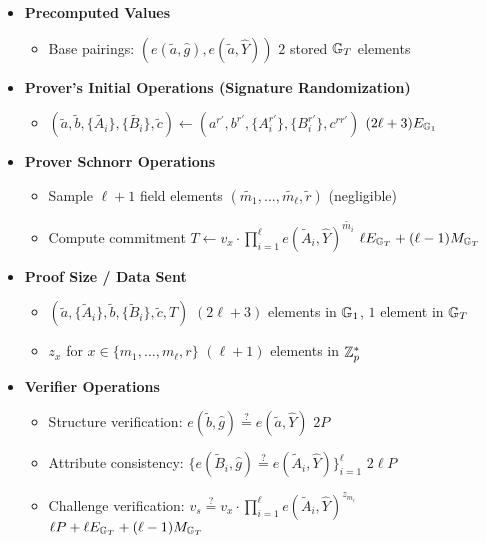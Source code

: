 \newpage
\begin{itemize}
    \item \textbf{Precomputed Values}
    \begin{itemize}
        \item Base pairings: $(e(\tilde{a}, \hat{g}), e(\tilde{a}, \widehat{Y}))$ \qquad $2$ stored $\mathbb{G}_T$ elements
    \end{itemize}

    \item \textbf{Prover's Initial Operations (Signature Randomization)}
    \begin{itemize}
        \item $(\tilde{a}, \tilde{b}, \{\tilde{A_i}\}, \{\tilde{B_i}\}, \tilde{c}) \gets (a^{r'}, b^{r'}, \{A_i^{r'}\}, \{B_i^{r'}\}, c^{rr'})$ \qquad $(2\ell + 3)E_{\mathbb{G}_1}$
    \end{itemize}
    
    \item \textbf{Prover Schnorr Operations}
    \begin{itemize}
        \item Sample $\ell+1$ field elements $(\tilde{m_1},\ldots,\tilde{m_\ell}, \tilde{r})$ \qquad (negligible)
        \item Compute commitment $T \gets v_x \cdot \prod_{i=1}^\ell e(\tilde{A}_i, \widehat{Y})^{\tilde{m_i}}$ \qquad $\ell E_{\mathbb{G}_T} + (\ell-1)M_{\mathbb{G}_T}$
    \end{itemize}
    
    \item \textbf{Proof Size / Data Sent}
    \begin{itemize}
        \item $(\tilde{a}, \{\tilde{A}_i\}, \tilde{b}, \{\tilde{B}_i\}, \tilde{c}, T)$ \qquad $(2\ell + 3)$ elements in $\mathbb{G}_1$, $1$ element in $\mathbb{G}_T$
        \item $z_x$ for $x \in \{m_1,\ldots,m_\ell, r\}$ \qquad $(\ell + 1)$ elements in $\mathbb{Z}_p^*$
    \end{itemize}
    
    \item \textbf{Verifier Operations}
    \begin{itemize}
        \item Structure verification: $e(\tilde{b}, \hat{g}) \stackrel{?}{=} e(\tilde{a}, \widehat{Y})$ \qquad $2P$
        \item Attribute consistency: $\{e(\tilde{B}_i, \hat{g}) \stackrel{?}{=} e(\tilde{A}_i, \widehat{Y})\}_{i=1}^\ell$ \qquad $2\ell P$
        \item Challenge verification: $v_s \stackrel{?}{=} v_x \cdot \prod_{i=1}^\ell e(\tilde{A}_i, \widehat{Y})^{z_{m_i}}$ \qquad $\ell P + \ell E_{\mathbb{G}_T} + (\ell-1)M_{\mathbb{G}_T}$
    \end{itemize}
\end{itemize}



